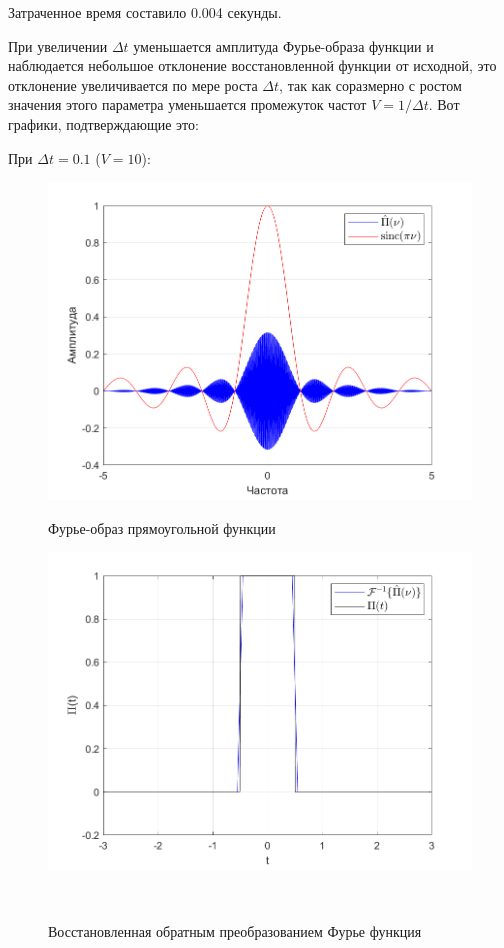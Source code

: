 \documentclass[a4paper]{article}
\begin{document}
Затраченное время составило 0.004 секунды.

При увеличении $\Delta t$ уменьшается амплитуда Фурье-образа функции и наблюдается небольшое отклонение восстановленной функции от исходной, это отклонение увеличивается по мере роста $\Delta t$, так как соразмерно с ростом значения этого параметра уменьшается промежуток частот $V = 1/\Delta t$. Вот графики, подтверждающие это:\

При $\Delta t = 0.1$ ($V = 10$):

\begin{figure}[H]
    \begin{minipage}{0.5\textwidth}
        \centering \includegraphics[width=\textwidth]{graphs/2/T_100_dt_0.1_V_10_dv_0.01/fourier_numerical.png}
        \caption{Фурье-образ прямоугольной функции}
    \end{minipage}\hfill
    \begin{minipage}{0.5\textwidth}
        \centering \includegraphics[width=\textwidth]{graphs/2/T_100_dt_0.1_V_10_dv_0.01/func_inversed_fourier.png}
        \caption{Восстановленная обратным преобразованием Фурье функция}
    \end{minipage}\\[1em]
\end{figure}\noindent\
\end{document}
